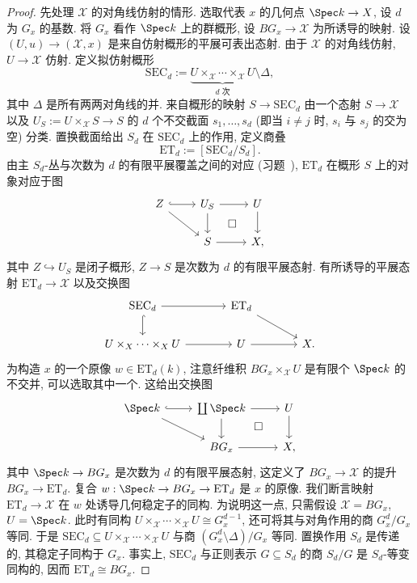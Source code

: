 \begin{proof}
先处理 $\mathcal X$ 的对角线仿射的情形. 选取代表 $x$ 的几何点 $\Spec k\to\mathcal X$, 设 $d$ 为 $G_x$ 的基数. 将 $G_x$ 看作 $\Spec k$ 上的群概形, 设 $BG_x\to\mathcal X$ 为所诱导的映射. 设 $(U,u)\to(\mathcal X,x)$ 是来自仿射概形的平展可表出态射. 由于 $\mathcal X$ 的对角线仿射, $U\to\mathcal X$ 仿射. 定义拟仿射概形
\[
\mathrm{SEC}_d:=\underbrace{U\times_{\mathcal X}\cdots\times_{\mathcal X}U}_{d\text{ 次}}\setminus\Delta,
\]
其中 $\Delta$ 是所有两两对角线的并. 来自概形的映射 $S\to\mathrm{SEC}_d$ 由一个态射 $S\to\mathcal X$ 以及 $U_S:=U\times_{\mathcal X}S\to S$ 的 $d$ 个不交截面 $s_1,\ldots,s_d$ (即当 $i\neq j$ 时, $s_i$ 与 $s_j$ 的交为空) 分类. 置换截面给出 $S_d$ 在 $\mathrm{SEC}_d$ 上的作用, 定义商叠
\[
\mathrm{ET}_d:=[\mathrm{SEC}_d/S_d].
\]
由主 $S_d$-丛与次数为 $d$ 的有限平展覆盖之间的对应 (习题~), $\mathrm{ET}_d$ 在概形 $S$ 上的对象对应于图
\[
\begin{tikzcd}
Z\arrow[r,hook]\arrow[dr]&U_S\arrow[r]\arrow[d]&U\arrow[d]\\
&S\arrow[r]\arrow[ur,phantom,"\square" description]&\mathcal X,
\end{tikzcd}
\]
其中 $Z\hookrightarrow U_S$ 是闭子概形, $Z\to S$ 是次数为 $d$ 的有限平展态射. 有所诱导的平展态射 $\mathrm{ET}_d\to\mathcal X$ 以及交换图
\[
\begin{tikzcd}[column sep=large]
\mathrm{SEC}_d\arrow[r]\arrow[d,hook]&\mathrm{ET}_d\arrow[dr]&\\
U\times_{\mathcal X}\cdots\times_{\mathcal X}U\arrow[r]&U\arrow[r]&\mathcal X.
\end{tikzcd}
\]
为构造 $x$ 的一个原像 $w\in\mathrm{ET}_d(k)$, 注意纤维积 $BG_x\times_{\mathcal X}U$ 是有限个 $\Spec k$ 的不交并, 可以选取其中一个. 这给出交换图
\[
\begin{tikzcd}
\Spec k\arrow[r,hook]\arrow[dr]&\coprod\Spec k\arrow[r]\arrow[d]&U\arrow[d]\\
&BG_x\arrow[r]\arrow[ur,phantom,"\square" description]&\mathcal X,
\end{tikzcd}
\]
其中 $\Spec k\to BG_x$ 是次数为 $d$ 的有限平展态射, 这定义了 $BG_x\to\mathcal X$ 的提升 $BG_x\to\mathrm{ET}_d$. 复合 $w:\Spec k\to BG_x\to\mathrm{ET}_d$ 是 $x$ 的原像. 我们断言映射 $\mathrm{ET}_d\to\mathcal X$ 在 $w$ 处诱导几何稳定子的同构. 为说明这一点, 只需假设 $\mathcal X=BG_x$, $U=\Spec k$. 此时有同构 $U\times_{\mathcal X}\cdots\times_{\mathcal X}U\cong G_x^{d-1}$, 还可将其与对角作用的商 $G_x^d/G_x$ 等同. 于是 $\mathrm{SEC}_d\subseteq U\times_{\mathcal X}\cdots\times_{\mathcal X}U$ 与商 $(G_x^d\setminus\Delta)/G_x$ 等同. 置换作用 $S_d$ 是传递的, 其稳定子同构于 $G_x$. 事实上, $\mathrm{SEC}_d$ 与正则表示 $G\subseteq S_d$ 的商 $S_d/G$ 是 $S_d$-等变同构的, 因而 $\mathrm{ET}_d\cong BG_x$.


\end{proof}
